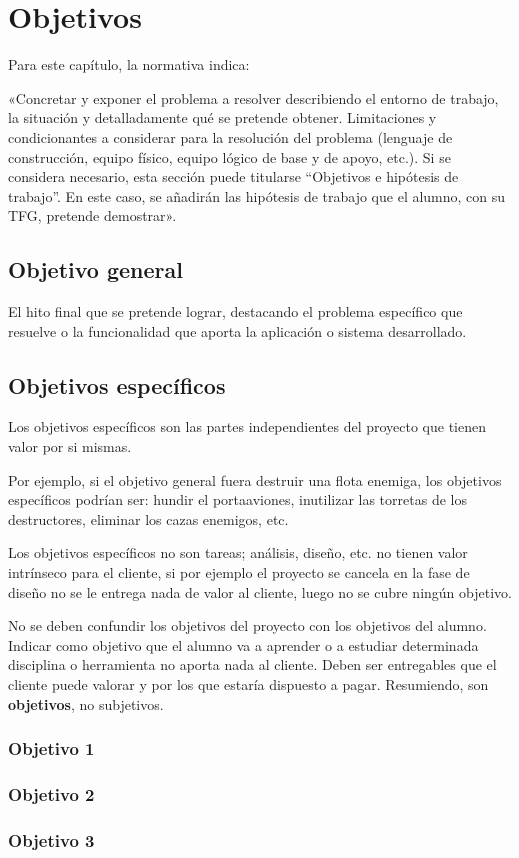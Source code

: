 \chapter{Objetivos}
\label{chap:objetivos}

\noindent
Para este capítulo, la normativa indica:

«Concretar y exponer el problema a resolver describiendo el entorno de trabajo,
la situación y detalladamente qué se pretende obtener. Limitaciones y
condicionantes a considerar para la resolución del problema (lenguaje de
construcción, equipo físico, equipo lógico de base y de apoyo, etc.). Si se
considera necesario, esta sección puede titularse ``Objetivos e hipótesis de
trabajo''. En este caso, se añadirán las hipótesis de trabajo que el alumno, con
su TFG, pretende demostrar».

\section{Objetivo general}

El hito final que se pretende lograr, destacando el problema específico que
resuelve o la funcionalidad que aporta la aplicación o sistema desarrollado.


\section{Objetivos específicos}

Los objetivos específicos son las partes independientes del proyecto que tienen
valor por si mismas.

Por ejemplo, si el objetivo general fuera destruir una flota enemiga, los
objetivos específicos podrían ser: hundir el portaaviones, inutilizar las
torretas de los destructores, eliminar los cazas enemigos, etc.

Los objetivos específicos no son tareas; análisis, diseño, etc. no tienen valor
intrínseco para el cliente, si por ejemplo el proyecto se cancela en la fase de
diseño no se le entrega nada de valor al cliente, luego no se cubre ningún
objetivo.

No se deben confundir los objetivos del proyecto con los objetivos del
alumno. Indicar como objetivo que el alumno va a aprender o a estudiar
determinada disciplina o herramienta no aporta nada al cliente. Deben ser
entregables que el cliente puede valorar y por los que estaría dispuesto
a pagar. Resumiendo, son \textbf{objetivos}, no subjetivos.

\subsection{Objetivo 1}

\subsection{Objetivo 2}

\subsection{Objetivo 3}


